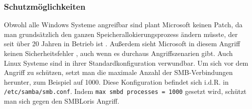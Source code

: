 \documentclass{AIFB_ITI_Crypto_Seminar}
\begin{document}
\subsubsection{Schutzmöglichkeiten}
Obwohl alle Windows Systeme angreifbar sind plant Microsoft keinen Patch, da man grundsätzlich den ganzen Speicherallokierungsprozess ändern müsste, der seit über 20 Jahren in Betrieb ist \cite{smbpatch}. Außerdem sieht Microsoft in diesem Angriff keinen Sicherheitsfehler \cite{smbrefuse}, auch wenn es durchaus Angriffszenarien gibt. Auch Linux Systeme sind in ihrer Standardkonfiguration verwundbar. Um sich vor dem Angriff zu schützen, setzt man die maximale Anzahl der SMB-Verbindungen herunter, zum Beispiel auf 1000. Diese Konfiguration befindet sich i.d.R. in \texttt{/etc/samba/smb.conf}. Indem \texttt{max smbd processes = 1000} gesetzt wird, schützt man sich gegen den SMBLoris Angriff.
\end{document}
